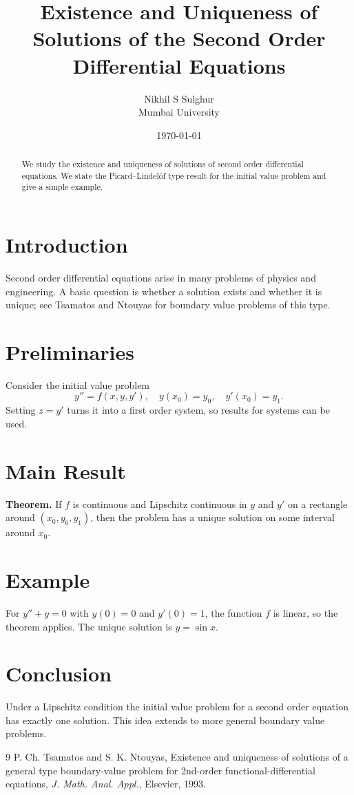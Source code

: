 \documentclass{article}
\title{Existence and Uniqueness of Solutions of the Second Order Differential Equations}
\author{Nikhil S Sulghur\\Mumbai University}
\date{\today}
\begin{document}
	\maketitle
	
	\begin{abstract}
		We study the existence and uniqueness of solutions of second order differential equations. We state the Picard--Lindel\"of type result for the initial value problem and give a simple example.
	\end{abstract}
	
	\section{Introduction}
	Second order differential equations arise in many problems of physics and engineering. A basic question is whether a solution exists and whether it is unique; see Tsamatos and Ntouyas \cite{TN} for boundary value problems of this type.
	
	\section{Preliminaries}
	Consider the initial value problem
	\[
	y''=f(x,y,y'),\quad y(x_0)=y_0,\quad y'(x_0)=y_1.
	\]
	Setting $z=y'$ turns it into a first order system, so results for systems can be used.
	
	\section{Main Result}
	\textbf{Theorem.} If $f$ is continuous and Lipschitz continuous in $y$ and $y'$ on a rectangle around $(x_0,y_0,y_1)$, then the problem has a unique solution on some interval around $x_0$.
	
	\section{Example}
	For $y''+y=0$ with $y(0)=0$ and $y'(0)=1$, the function $f$ is linear, so the theorem applies. The unique solution is $y=\sin x$.
	
	\section{Conclusion}
	Under a Lipschitz condition the initial value problem for a second order equation has exactly one solution. This idea extends to more general boundary value problems.
	
	\begin{thebibliography}{9}
		 P. Ch. Tsamatos and S. K. Ntouyas, Existence and uniqueness of solutions of a general type boundary-value problem for 2nd-order functional-differential equations, \emph{J. Math. Anal. Appl.}, Elsevier, 1993.
	\end{thebibliography}
\end{document}
